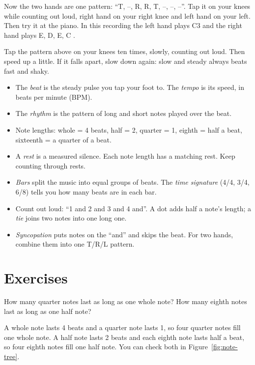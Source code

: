 Now the two hands are one pattern: ``T, --, R, R, T, --, --, --''. Tap it on your knees while counting out loud, right hand on your right knee and left hand on your left. Then try it at the piano. In this recording the left hand plays C3 and the right hand plays E, D, E, C .

\begin{tryitbox}
Tap the pattern above on your knees ten times, slowly, counting out loud. Then speed up a little. If it falls apart, slow down again: slow and steady always beats fast and shaky.
\end{tryitbox}

\begin{summarybox}
\begin{itemize}
  \item The \emph{beat} is the steady pulse you tap your foot to. The \emph{tempo} is its speed, in beats per minute (BPM).
  \item The \emph{rhythm} is the pattern of long and short notes played over the beat.
  \item Note lengths: whole = 4 beats, half = 2, quarter = 1, eighth = half a beat, sixteenth = a quarter of a beat.
  \item A \emph{rest} is a measured silence. Each note length has a matching rest. Keep counting through rests.
  \item \emph{Bars} split the music into equal groups of beats. The \emph{time signature} (4/4, 3/4, 6/8) tells you how many beats are in each bar.
  \item Count out loud: ``1 and 2 and 3 and 4 and''. A dot adds half a note's length; a \emph{tie} joins two notes into one long one.
  \item \emph{Syncopation} puts notes on the ``and'' and skips the beat. For two hands, combine them into one T/R/L pattern.
\end{itemize}
\end{summarybox}

\section*{Exercises}

\begin{exercise}
How many quarter notes last as long as one whole note? How many eighth notes last as long as one half note?
\end{exercise}

\begin{answerbox}
A whole note lasts 4 beats and a quarter note lasts 1, so four quarter notes fill one whole note. A half note lasts 2 beats and each eighth note lasts half a beat, so four eighth notes fill one half note. You can check both in Figure~\ref{fig:note-tree}.
\end{answerbox}

